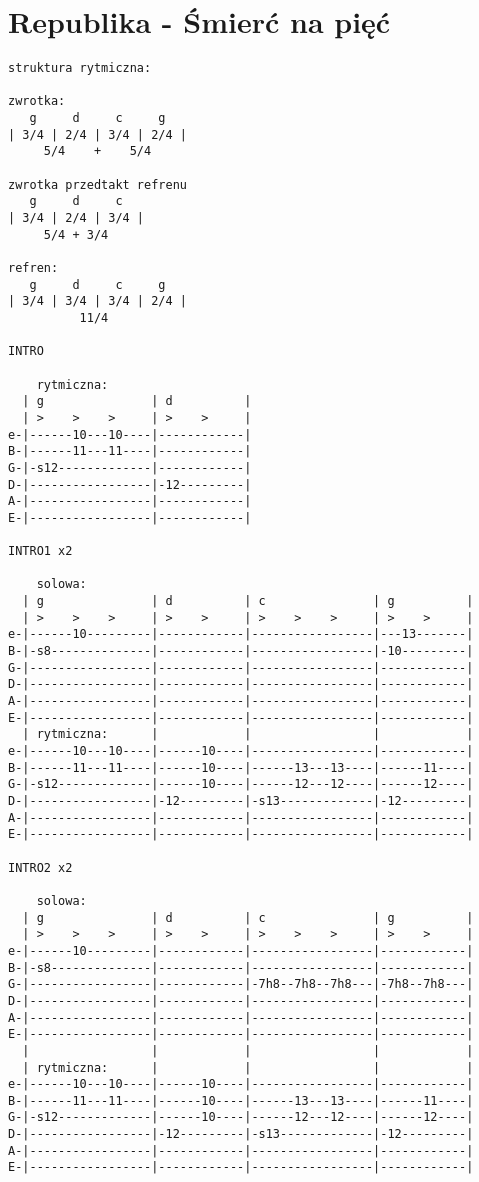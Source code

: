\section{Republika - Śmierć na pięć}
\begin{verbatim}
struktura rytmiczna:

zwrotka:
   g     d     c     g
| 3/4 | 2/4 | 3/4 | 2/4 |
     5/4    +    5/4

zwrotka przedtakt refrenu
   g     d     c
| 3/4 | 2/4 | 3/4 |
     5/4 + 3/4  

refren:
   g     d     c     g
| 3/4 | 3/4 | 3/4 | 2/4 |
          11/4

INTRO

    rytmiczna:
  | g               | d          |
  | >    >    >     | >    >     |
e-|------10---10----|------------|
B-|------11---11----|------------|
G-|-s12-------------|------------|
D-|-----------------|-12---------|
A-|-----------------|------------|
E-|-----------------|------------|
      
INTRO1 x2

    solowa:
  | g               | d          | c               | g          |
  | >    >    >     | >    >     | >    >    >     | >    >     |
e-|------10---------|------------|-----------------|---13-------|
B-|-s8--------------|------------|-----------------|-10---------|
G-|-----------------|------------|-----------------|------------|
D-|-----------------|------------|-----------------|------------|
A-|-----------------|------------|-----------------|------------|
E-|-----------------|------------|-----------------|------------|
  | rytmiczna:      |            |                 |            |
e-|------10---10----|------10----|-----------------|------------|
B-|------11---11----|------10----|------13---13----|------11----|
G-|-s12-------------|------10----|------12---12----|------12----|
D-|-----------------|-12---------|-s13-------------|-12---------|
A-|-----------------|------------|-----------------|------------|
E-|-----------------|------------|-----------------|------------|

INTRO2 x2

    solowa:
  | g               | d          | c               | g          |
  | >    >    >     | >    >     | >    >    >     | >    >     |
e-|------10---------|------------|-----------------|------------|
B-|-s8--------------|------------|-----------------|------------|
G-|-----------------|------------|-7h8--7h8--7h8---|-7h8--7h8---|
D-|-----------------|------------|-----------------|------------|
A-|-----------------|------------|-----------------|------------|
E-|-----------------|------------|-----------------|------------|
  |                 |            |                 |            |
  | rytmiczna:      |            |                 |            |
e-|------10---10----|------10----|-----------------|------------|
B-|------11---11----|------10----|------13---13----|------11----|
G-|-s12-------------|------10----|------12---12----|------12----|
D-|-----------------|-12---------|-s13-------------|-12---------|
A-|-----------------|------------|-----------------|------------|
E-|-----------------|------------|-----------------|------------|


\end{verbatim}
